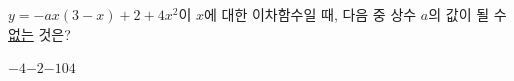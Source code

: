 $y=-ax(3-x)+2+4x^2$이 $x$에 대한 이차함수일 때, 다음 중 상수 $a$의 값이 될 수 \underline{없는} 것은?
\begin{choices32}{$-4$}{$-2$}{$-1$}{$0$}{$4$}\end{choices32}
